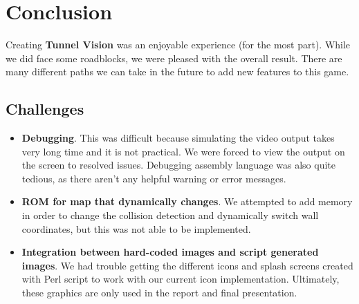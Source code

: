 \documentclass[11pt]{article}
\begin{document}
		
		

		
	


\section{Conclusion}
Creating \textbf{Tunnel Vision} was an enjoyable experience (for the most part).  While we did face some roadblocks, we were pleased with the overall result.  There are many different paths we can take in the future to add new features to this game.

	\subsection{Challenges}
		
		\begin{itemize}				
		
		\item \textbf{Debugging}. This was difficult because simulating the video output takes very long time and it is not practical. We were forced to view the output on the screen to resolved issues.  Debugging assembly language was also quite tedious, as there aren't any helpful warning or error messages.  
	
		\item \textbf{ROM for map that dynamically changes}. We attempted to add memory in order to change the collision detection and dynamically switch wall coordinates, but this was not able to be implemented.
		
		\item \textbf{Integration between hard-coded images and script generated images}.  We had trouble getting the different icons and splash screens created with Perl script to work with our current icon implementation.  Ultimately, these graphics are only used in the report and final presentation.
				
		\end{itemize}
\end{document}
